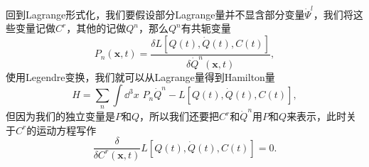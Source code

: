 \documentclass[10pt]{extbook}
\theoremstyle{plain}%
\begin{document}
回到Lagrange形式化，我们要假设部分Lagrange量并不显含部分变量$\dot{\Psi}^l$，我们将这些变量记做$C^r$，其他的记做$Q^n$，那么$Q^n$有共轭变量
\[
	P_n(\mathbf{x},t)=\frac{\delta L[Q(t),\dot{Q}(t),C(t)]}{\delta \dot{Q}^n(\mathbf{x},t)},
\]
使用Legendre变换，我们就可以从Lagrange量得到Hamilton量
\[
	H=\sum_n \int \dd^3 x \,\, P_n\dot{Q}^n-L[Q(t),\dot{Q}(t),C(t)],
\]
但因为我们的独立变量是$P$和$Q$，所以我们还要把$C^r$和$\dot{Q}^n$用$P$和$Q$来表示，此时关于$C^r$的运动方程写作
\[
	\frac{\delta}{\delta C^r(\mathbf{x},t)}L[Q(t),\dot{Q}(t),C(t)]=0.
\]
\end{document}
